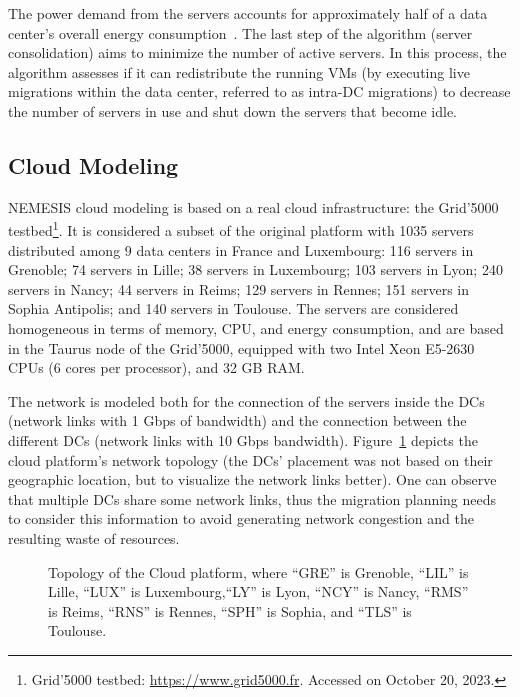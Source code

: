 The power demand from the servers accounts for approximately half of a data center's overall energy consumption~\cite{power_to_the_people}. The last step of the algorithm (server consolidation) aims to minimize the number of active servers. In this process, the algorithm assesses if it can redistribute the running VMs (by executing live migrations within the data center, referred to as intra-DC migrations) to decrease the number of servers in use and shut down the servers that become idle.

\subsection{Cloud Modeling}\label{sec:cloud_model}

NEMESIS cloud modeling is based on a real cloud infrastructure: the Grid'5000 testbed\footnote{Grid'5000 testbed: \url{https://www.grid5000.fr}. Accessed on October 20, 2023.}. It is considered a subset of the original platform with 1035 servers distributed among 9 data centers in France and Luxembourg: 116 servers in Grenoble; 74 servers in Lille; 38 servers in Luxembourg; 103 servers in Lyon; 240 servers in Nancy; 44 servers in Reims;  129 servers in Rennes;  151 servers in Sophia Antipolis; and 140 servers in Toulouse. The servers are considered homogeneous in terms of memory, CPU, and energy consumption, and are based in the Taurus node of the Grid'5000, equipped with two Intel Xeon E5-2630 CPUs (6 cores per processor), and 32 GB RAM.

The network is modeled both for the connection of the servers inside the DCs (network links with 1 Gbps of bandwidth) and the connection between the different DCs  (network links with 10 Gbps bandwidth). Figure~\ref{fig:topology} depicts the cloud platform's network topology (the DCs' placement was not based on their geographic location, but to visualize the network links better). One can observe that multiple DCs share some network links, thus the migration planning needs to consider this information to avoid generating network congestion and the resulting waste of resources.

\begin{figure}[h]
  \centering
   {}
  \caption{Topology of the Cloud platform, where ``GRE'' is Grenoble,  ``LIL'' is Lille, ``LUX'' is Luxembourg,``LY'' is Lyon, ``NCY'' is Nancy, ``RMS'' is Reims,  ``RNS'' is Rennes, ``SPH'' is Sophia, and  ``TLS'' is Toulouse.}
  \label{fig:topology}
 \end{figure}
 


